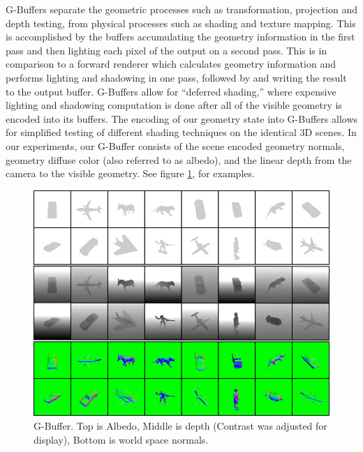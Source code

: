 \documentclass[10pt,twocolumn,letterpaper]{article}
\begin{document}
G-Buffers separate the geometric processes such as transformation, projection and depth testing, from physical processes such as shading and texture mapping.  This is accomplished by the buffers accumulating the geometry information in the first pass and then lighting each pixel of the output on a second pass.  This is in comparison to a forward renderer which calculates geometry information and performs lighting and shadowing in one pass, followed by and writing the result to the output buffer.  
G-Buffers allow for ``deferred shading,'' where expensive lighting and shadowing computation is done after all of the visible geometry is encoded into its buffers.
 The encoding of our geometry state into G-Buffers allows for simplified testing of different shading techniques on the identical 3D scenes.
In our experiments, our G-Buffer consists of the scene encoded geometry normals, geometry diffuse color (also referred to as albedo), and the linear depth from the camera to the visible geometry.  See figure \ref{fig:GBUFFER_ALBEDO}, for examples.
\begin{figure}[h!]
\centering
\includegraphics[width=0.8\columnwidth]{./assets/synth_gbuffer_framed.png}
\caption{G-Buffer. Top is Albedo, Middle is depth (Contrast was adjusted for display), Bottom is world space normals.}
\label{fig:GBUFFER_ALBEDO}
\end{figure}

\end{document}
